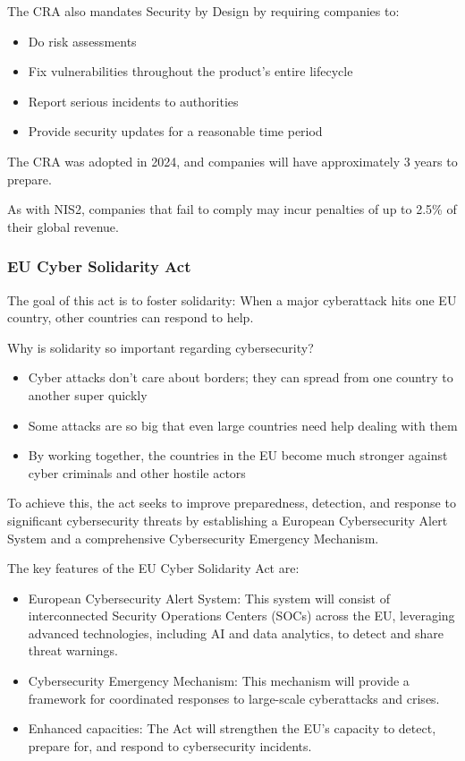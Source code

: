 The CRA also mandates Security by Design by requiring companies to:

\begin{itemize}
    \item Do risk assessments
    \item Fix vulnerabilities throughout the product's entire lifecycle
    \item Report serious incidents to authorities
    \item Provide security updates for a reasonable time period
\end{itemize}

The CRA was adopted in 2024, and companies will have approximately 3 years to prepare. 

As with NIS2, companies that fail to comply may incur penalties of up to 2.5\% of their global revenue.

\subsubsection{EU Cyber Solidarity Act}

The goal of this act is to foster solidarity: When a major cyberattack hits one EU country, other countries can respond to help.

Why is solidarity so important regarding cybersecurity?

\begin{itemize}
    \item Cyber attacks don't care about borders; they can spread from one country to another super quickly
    \item Some attacks are so big that even large countries need help dealing with them
    \item By working together, the countries in the EU become much stronger against cyber criminals and other hostile actors
\end{itemize}

To achieve this, the act seeks to improve preparedness, detection, and response to significant cybersecurity threats by establishing a European Cybersecurity Alert System and a comprehensive Cybersecurity Emergency Mechanism.

The key features of the EU Cyber Solidarity Act are:

\begin{itemize}
    \item European Cybersecurity Alert System: This system will consist of interconnected Security Operations Centers (SOCs) across the EU, leveraging advanced technologies, including AI and data analytics, to detect and share threat warnings.
    \item Cybersecurity Emergency Mechanism: This mechanism will provide a framework for coordinated responses to large-scale cyberattacks and crises.
    \item Enhanced capacities: The Act will strengthen the EU's capacity to detect, prepare for, and respond to cybersecurity incidents.
\end{itemize}

